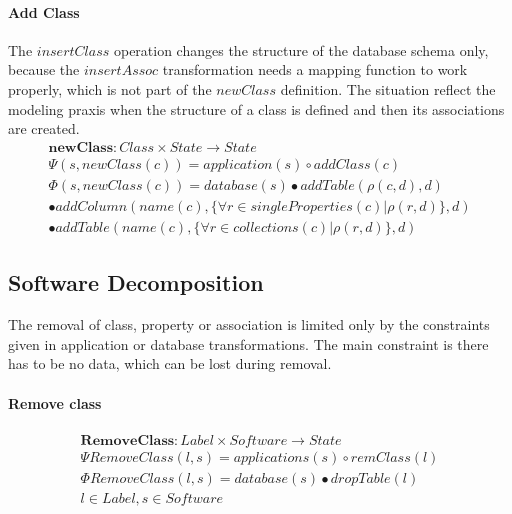 \documentclass[11pt]{article}
\begin{document}
\paragraph{Add Class} The $insertClass$ operation changes the structure of the database schema only, because the $insertAssoc$ transformation needs a mapping function to work properly, which is not part of the $newClass$ definition. The situation reflect the modeling praxis when the structure of a class is defined and then its associations are created.
\begin{align*}
\mathbf{newClass} : Class \times State \rightarrow State \\
\Psi(s, newClass(c)) = application(s) \circ addClass(c) \\
\Phi(s, newClass(c)) = database(s)  \bullet addTable(\rho(c,d), d) \\ \bullet addColumn(name(c), \{\forall r \in singleProperties(c) | \rho(r,d)\}, d) \\ \bullet addTable(name(c), \{\forall r \in collections(c) | \rho(r,d)\}, d)  
\end{align*}




\subsection{Software Decomposition}
The removal of class, property or association is limited only by the constraints given in application or database transformations. The main constraint is there has to be no data, which can be lost during removal. 
\paragraph{Remove class}
\begin{align*}
	\mathbf{RemoveClass}: Label \times Software \rightarrow State  \\
	\Psi RemoveClass(l, s) = applications(s) \circ remClass(l) \\
	\Phi RemoveClass(l, s) = database(s) \bullet dropTable(l) \\
	l \in Label, s \in Software 
\end{align*}
\end{document}
